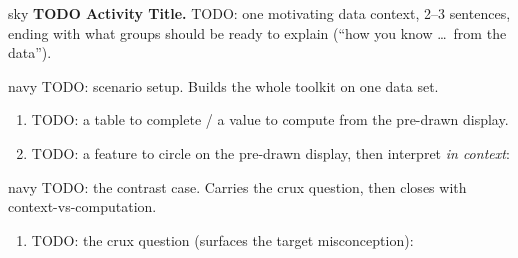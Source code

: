 \documentclass[12pt]{article}
\newcommand{\answerspace}[2]{\par\nopagebreak\noindent\begin{minipage}[t][#1][t]{\linewidth}%
  \color{keyred}\bfseries #2\end{minipage}\par}
\begin{document}

\vspace{0.06in}

\begin{headlinebox}{sky}
\textbf{TODO Activity Title.} TODO: one motivating data context, 2--3 sentences, ending with what
groups should be ready to explain (``how you know \dots\ from the data'').
\end{headlinebox}

\vspace{0.04in}

\begin{scenariobox}{navy}
TODO: scenario setup. Builds the whole toolkit on one data set.
\begin{enumerate}[label=\textbf{\alph*.}, leftmargin=1.8em, itemsep=8pt]
  \item TODO: a table to complete / a value to compute from the pre-drawn display.
  \item TODO: a feature to circle on the pre-drawn display, then interpret \emph{in context}:
        \answerspace{2.0cm}{}
\end{enumerate}
\end{scenariobox}

\boxguard[16]
\begin{scenariobox}{navy}
TODO: the contrast case. Carries the crux question, then closes with context-vs-computation.
\begin{enumerate}[label=\textbf{\alph*.}, leftmargin=1.8em, itemsep=8pt]
  \item TODO: the crux question (surfaces the target misconception):
        \answerspace{2.6cm}{}
\end{enumerate}
\end{scenariobox}
\end{document}
